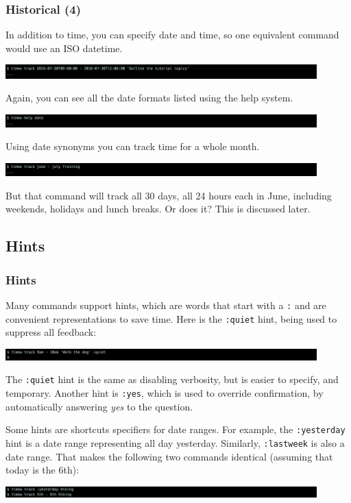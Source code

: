 \documentclass[t,handout]{beamer}
\begin{document}
\begin{frame}[fragile]\frametitle{Historical (4)}
    \vfill
    In addition to time, you can specify date and time, so one equivalent command would use an ISO datetime.

    \includegraphics[width=12cm]{images/tutorial18.png}

    Again, you can see all the date formats listed using the help system.

    \includegraphics[width=12cm]{images/tutorial19.png}

    Using date synonyms you can track time for a whole month.

    \includegraphics[width=12cm]{images/tutorial20.png}

    But that command will track all 30 days, all 24 hours each in June, including weekends, holidays and lunch breaks. Or does it? This is discussed later.
\end{frame}

\subsection{Hints}

\begin{frame}[fragile]\frametitle{Hints}
    \vfill
    Many commands support hints, which are words that start with a \verb=:= and are convenient representations to save time. Here is the \verb=:quiet= hint, being used to suppress all feedback:

    \includegraphics[width=12cm]{images/tutorial21.png}

    The \verb=:quiet= hint is the same as disabling verbosity, but is easier to specify, and temporary. Another hint is \verb=:yes=, which is used to override confirmation, by automatically answering \textit{yes} to the question.

    Some hints are shortcuts specifiers for date ranges. For example, the \verb=:yesterday= hint is a date range representing all day yesterday. Similarly, \verb=:lastweek= is also a date range. That makes the following two commands identical (assuming that today is the 6th):

    \includegraphics[width=12cm]{images/tutorial22.png}
\end{frame}
\end{document}
